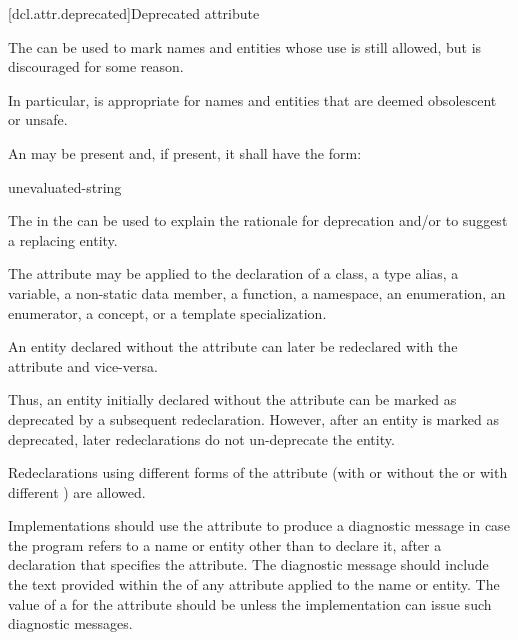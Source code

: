 [dcl.attr.deprecated]{Deprecated attribute}%

\pnum
The   can be used to mark names and entities
whose use is still allowed, but is discouraged for some reason.
\begin{note}
In particular,
 is appropriate for names and entities that are deemed obsolescent or
unsafe.
\end{note}
An
 may be present and, if present, it shall have the form:
\begin{ncbnf}
\terminal{(} unevaluated-string \terminal{)}
\end{ncbnf}
\begin{note}
The  in the 
can be used to explain the rationale for deprecation and/or to suggest a replacing entity.
\end{note}

\pnum
The attribute may be applied to the declaration of
a class,
a type alias,
a variable,
a non-static data member,
a function,
a namespace,
an enumeration,
an enumerator,
a concept, or
a template specialization.

\pnum
An entity declared without the  attribute can later be redeclared
with the attribute and vice-versa.
\begin{note}
Thus, an entity initially declared without the
attribute can be marked as deprecated by a subsequent redeclaration. However, after an entity
is marked as deprecated, later redeclarations do not un-deprecate the entity.
\end{note}
Redeclarations using different forms of the attribute (with or without the
 or with different
) are allowed.

\pnum
\recommended
Implementations should use the  attribute to produce a diagnostic
message in case the program refers to a name or entity other than to declare it, after a
declaration that specifies the attribute. The diagnostic message should include the text provided
within the  of any  attribute applied
to the name or entity.
The value of
a  for the  attribute
should be 
unless the implementation can issue such diagnostic messages.

